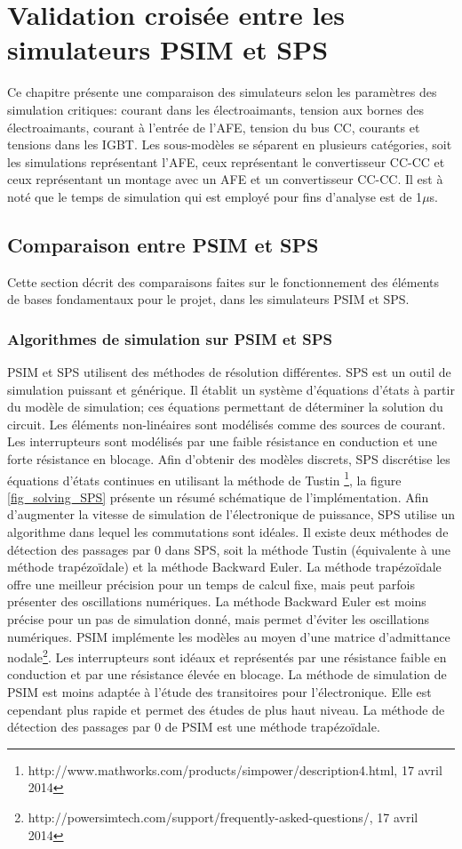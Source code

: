 \chapter{Validation croisée entre les simulateurs PSIM et SPS}
Ce chapitre présente une comparaison des simulateurs selon les paramètres des simulation critiques: courant dans les électroaimants, tension aux bornes des électroaimants, courant à l'entrée de l'AFE, tension du bus CC, courants et tensions dans les IGBT. Les sous-modèles se séparent en plusieurs catégories, soit les simulations représentant l'AFE, ceux représentant le convertisseur CC-CC et ceux représentant un montage avec un AFE et un convertisseur CC-CC. Il est à noté que le temps de simulation qui est employé pour fins d'analyse est de 1$\mu$s. 

\section{Comparaison entre PSIM et SPS}
Cette section décrit des comparaisons faites sur le fonctionnement des éléments de bases fondamentaux pour le projet, dans les simulateurs PSIM et SPS.
\subsection{Algorithmes de simulation sur PSIM et SPS}
PSIM et SPS utilisent des méthodes de résolution différentes. SPS est un outil de simulation puissant et générique. Il établit un système d'équations d'états à partir du modèle de simulation; ces équations permettant de déterminer la solution du circuit. Les éléments non-linéaires sont modélisés comme des sources de courant. Les interrupteurs sont modélisés par une faible résistance en conduction et une forte résistance en blocage. Afin d'obtenir des modèles discrets, SPS discrétise les équations d'états continues en utilisant la méthode de Tustin  \footnote{http://www.mathworks.com/products/simpower/description4.html, 17 avril 2014}, la figure \ref{fig_solving_SPS} présente un résumé schématique de l'implémentation. Afin d'augmenter la vitesse de simulation de l'électronique de puissance, SPS utilise un algorithme dans lequel les commutations sont idéales. Il existe deux méthodes de détection des passages par 0 dans SPS, soit la méthode Tustin (équivalente à une méthode trapézoïdale) et la méthode Backward Euler. La méthode trapézoïdale offre une meilleur précision pour un temps de calcul fixe, mais peut parfois présenter des oscillations numériques. La méthode Backward Euler est moins précise pour un pas de simulation donné, mais permet d'éviter les oscillations numériques. PSIM implémente les modèles au moyen d'une matrice d'admittance nodale\footnote{http://powersimtech.com/support/frequently-asked-questions/, 17 avril 2014}. Les interrupteurs sont idéaux et représentés par une résistance faible en conduction et par une résistance élevée en blocage. La méthode de simulation de PSIM est moins adaptée à l'étude des transitoires pour l'électronique. Elle est cependant plus rapide et permet des études de plus haut niveau. La méthode de détection des passages par 0 de PSIM est une méthode trapézoïdale. 

